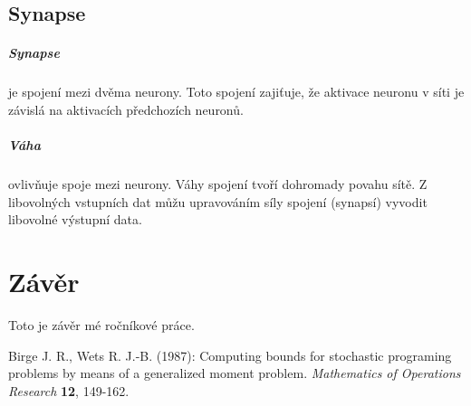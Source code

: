 \documentclass[12pt,a4paper]{report}
\begin{document}
	\section{Synapse}
		\paragraph{Synapse} je spojení mezi dvěma neurony. Toto spojení zajiťuje, že aktivace neuronu v síti je závislá na aktivacích předchozích neuronů.
		\paragraph{Váha}
		ovlivňuje spoje mezi neurony. Váhy spojení tvoří dohromady povahu sítě. Z libovolných vstupních dat můžu upravováním síly spojení (synapsí) vyvodit libovolné výstupní data. 
	


\chapter{Závěr}
Toto je závěr mé ročníkové práce.

\begin{thebibliography}{99}

Birge J. R., Wets R. J.-B. (1987): Computing bounds for stochastic programing problems by means of a generalized moment problem. \textit{Mathematics of Operations Research} \textbf{12}, 149-162.
\end{thebibliography}


\openright
\end{document}
